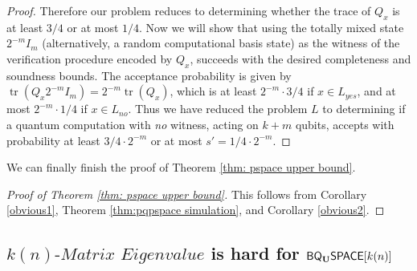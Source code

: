 \documentclass[11pt]{article}
\newtheorem{corollary}[theorem]{Corollary}
\theoremstyle{definition}
\theoremstyle{remark}
\newcommand\spechamiltonian[1]{#1\textit{-Matrix Eigenvalue}}
\newcommand{\classfont}{\sf}
\newcommand{\Unitary}{\mathbf{U}}
\newcommand{\unitaryQSPACE}[3]{{\classfont{Q}_\Unitary\classfont{SPACE}}[#1](#2,#3)}
\newcommand{\unitaryBQSPACE}[1]{{\classfont{BQ}_\Unitary\classfont{SPACE}}[#1]}
\DeclareMathOperator{\tr}{tr}
\begin{document}
\begin{proof}
Therefore our problem reduces to determining whether the trace of $Q_x$ is at least $3/4$ or at most $1/4$.  Now we will show that using the totally mixed state $2^{-m}I_m$ (alternatively, a random computational basis state) as the witness of the verification procedure encoded by $Q_x$, succeeds with the desired completeness and soundness bounds.  The acceptance probability is given by
$\tr(Q_x 2^{-m}I_m) = 2^{-m} \tr(Q_x)$,
which is at least $2^{-m} \cdot 3/4$ if $x\in L_{yes}$, and at most $2^{-m} \cdot 1/4$ if $x\in L_{no}$. Thus we have reduced the problem $L$ to determining if a quantum computation with \emph{no} witness, acting on $k+m$ qubits, accepts with probability at least $3/4 \cdot 2^{-m}$ or at most $s'=1/4 \cdot 2^{-m}$.
\end{proof}
We can finally finish the proof of Theorem \ref{thm: pspace upper bound}.
\begin{proof}[Proof of Theorem \ref{thm: pspace upper bound}]
This follows from Corollary \ref{obvious1}, Theorem \ref{thm:pqpspace simulation}, and Corollary \ref{obvious2}.
\end{proof}

%

\subsection{$\spechamiltonian{k(n)}$ is hard for $\unitaryBQSPACE{k(n)}$}
\end{document}
